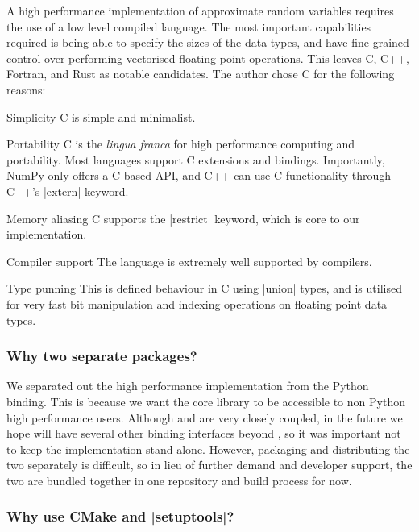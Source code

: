 A high performance implementation of approximate random variables requires the use of a low level compiled language. The most important capabilities required is being able to specify the sizes of the data types, and have fine grained control over performing vectorised floating point operations. This leaves C, C++, Fortran, and Rust as notable candidates. The author chose C for the following reasons:
\begin{longdescription}
\item[Simplicity] C is simple and minimalist. 

\item[Portability] C is the \textit{lingua franca} for high performance computing and portability. Most languages support C extensions and bindings. Importantly, NumPy only offers a C based API, and C++ can use C functionality through C++'s \inlineplain|extern| keyword.

\item[Memory aliasing] C supports the \inlinec|restrict| keyword, which is core to our implementation. 

\item[Compiler support] The language is extremely well supported by compilers.

\item[Type punning] This is defined behaviour in C using \inlineplain|union| types, and is utilised for very fast bit manipulation and indexing operations on floating point data types. 
\end{longdescription}

\subsubsection{Why two separate packages?}

We separated out the high performance \arv implementation from the Python binding. This is because we want the core library to be accessible to non Python high performance users. Although \arv and \pyarv are very closely coupled, in the future we hope \arv will have several other binding interfaces beyond \pyarv, so it was important not to keep the \arv implementation stand alone. However, packaging and distributing the two separately is difficult, so in lieu of further demand and developer support, the two are bundled together in one repository and build process for now. 

\subsubsection{Why use CMake and \inlineplain|setuptools|?}

